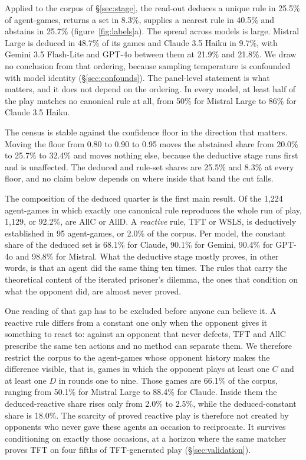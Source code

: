 \documentclass[11pt,a4paper]{article}
\begin{document}
Applied to the corpus of \S\ref{sec:stage}, the read-out deduces a unique rule
in 25.5\% of agent-games, returns a set in 8.3\%, supplies a nearest rule in
40.5\% and abstains in 25.7\% (figure~\ref{fig:labels}a). The spread across
models is large. Mistral Large is deduced in 48.7\% of its games and Claude
3.5 Haiku in 9.7\%, with Gemini 3.5 Flash-Lite and GPT-4o between them at
21.9\% and 21.8\%. We draw no conclusion from that ordering, because sampling
temperature is confounded with model identity (\S\ref{sec:confounds}). The
panel-level statement is what matters, and it does not depend on the ordering.
In every model, at least half of the play matches no canonical rule at all,
from 50\% for Mistral Large to 86\% for Claude 3.5 Haiku.

The census is stable against the confidence floor in the direction that
matters. Moving the floor from 0.80 to 0.90 to 0.95 moves the abstained share
from 20.0\% to 25.7\% to 32.4\% and moves nothing else, because the deductive
stage runs first and is unaffected. The deduced and rule-set shares are 25.5\%
and 8.3\% at every floor, and no claim below depends on where inside that band
the cut falls.

The composition of the deduced quarter is the first main result. Of the
1{,}224 agent-games in which exactly one canonical rule reproduces the whole
run of play, 1{,}129, or 92.2\%, are AllC or AllD. A \emph{reactive} rule, TFT
or WSLS, is deductively established in 95 agent-games, or 2.0\% of the corpus.
Per model, the constant share of the deduced set is 68.1\% for Claude, 90.1\%
for Gemini, 90.4\% for GPT-4o and 98.8\% for Mistral. What the deductive stage
mostly proves, in other words, is that an agent did the same thing ten times.
The rules that carry the theoretical content of the iterated prisoner's
dilemma, the ones that condition on what the opponent did, are almost never
proved.

One reading of that gap has to be excluded before anyone can believe it. A
reactive rule differs from a constant one only when the opponent gives it
something to react to: against an opponent that never defects, TFT and AllC
prescribe the same ten actions and no method can separate them. We therefore
restrict the corpus to the agent-games whose opponent history makes the
difference visible, that is, games in which the opponent plays at least one
$C$ and at least one $D$ in rounds one to nine. Those games are 66.1\% of the
corpus, ranging from 50.1\% for Mistral Large to 88.4\% for Claude. Inside
them the deduced-reactive share rises only from 2.0\% to 2.5\%, while the
deduced-constant share is 18.0\%. The scarcity of proved reactive play is
therefore not created by opponents who never gave these agents an occasion to
reciprocate. It survives conditioning on exactly those occasions, at a horizon
where the same matcher proves TFT on four fifths of TFT-generated play
(\S\ref{sec:validation}).
\end{document}
